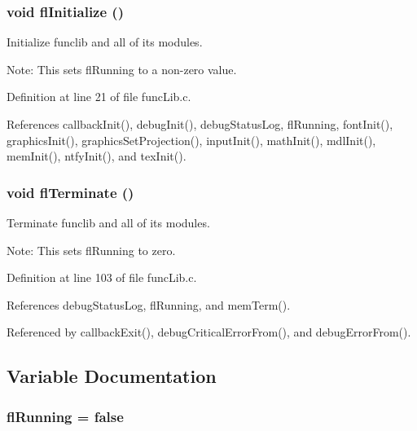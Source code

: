 \subsubsection{\setlength{\rightskip}{0pt plus 5cm}void fl\-Initialize ()}\label{funcLib_8c_77803041c232261f158b071f587b9d08}


Initialize funclib and all of its modules. 

\begin{Desc}
\item[Note:]This sets fl\-Running to a non-zero value. \end{Desc}


Definition at line 21 of file func\-Lib.c.

References callback\-Init(), debug\-Init(), debug\-Status\-Log, fl\-Running, font\-Init(), graphics\-Init(), graphics\-Set\-Projection(), input\-Init(), math\-Init(), mdl\-Init(), mem\-Init(), ntfy\-Init(), and tex\-Init().
\subsubsection{\setlength{\rightskip}{0pt plus 5cm}void fl\-Terminate ()}\label{funcLib_8c_3f1263fb36b6e7a11d53bafafb251729}


Terminate funclib and all of its modules. 

\begin{Desc}
\item[Note:]This sets fl\-Running to zero. \end{Desc}


Definition at line 103 of file func\-Lib.c.

References debug\-Status\-Log, fl\-Running, and mem\-Term().

Referenced by callback\-Exit(), debug\-Critical\-Error\-From(), and debug\-Error\-From().

\subsection{Variable Documentation}
\subsubsection{ {\bf fl\-Running} = false}\label{funcLib_8c_044d8733170ae7fcbfc6a4fd94c17dd8}


